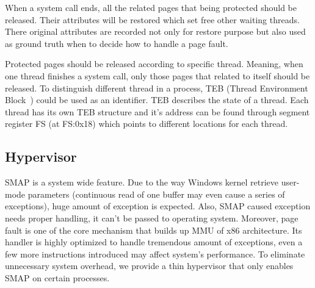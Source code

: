 When a system call ends, all the related pages that being protected should be released. Their attributes will be restored which set free other waiting threads. There original attributes are recorded not only for restore purpose but also used as ground truth when to decide how to handle a page fault.

Protected pages should be released according to specific thread. Meaning, when one thread finishes a system call, only those pages that related to itself should be released. To distinguish different thread in a process, TEB (Thread Environment Block~\cite{teb}) could be used as an identifier. TEB describes the state of a thread. Each thread has its own TEB structure and it's address can be found through segment register FS (at FS:0x18) which points to different locations for each thread. 

\subsection{Hypervisor}

SMAP is a system wide feature. Due to the way Windows kernel retrieve user-mode parameters (continuous read of one buffer may even cause a series of exceptions), huge amount of exception is expected. Also, SMAP caused exception needs proper handling, it can't be passed to operating system. Moreover, page fault is one of the core mechanism that builds up MMU of x86 architecture. Its handler is highly optimized to handle tremendous amount of exceptions, even a few more instructions introduced may affect system's performance.  To eliminate unnecessary system overhead, we provide a thin hypervisor that only enables SMAP on certain processes.

